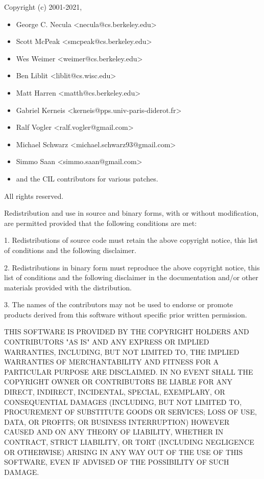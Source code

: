 \documentclass[letterpaper]{article}
\begin{document}
Copyright (c) 2001-2021,
\begin{itemize}
\item George C. Necula    <necula@cs.berkeley.edu>
\item Scott McPeak        <smcpeak@cs.berkeley.edu>
\item Wes Weimer          <weimer@cs.berkeley.edu>
\item Ben Liblit          <liblit@cs.wisc.edu>
\item Matt Harren         <matth@cs.berkeley.edu>
\item Gabriel Kerneis     <kerneis@pps.univ-paris-diderot.fr>
\item Ralf Vogler         <ralf.vogler@gmail.com>
\item Michael Schwarz     <michael.schwarz93@gmail.com>
\item Simmo Saan          <simmo.saan@gmail.com>
\item and the CIL contributors for various patches.
\end{itemize}
All rights reserved.

Redistribution and use in source and binary forms, with or without
modification, are permitted provided that the following conditions are met:

1. Redistributions of source code must retain the above copyright notice,
this list of conditions and the following disclaimer.

2. Redistributions in binary form must reproduce the above copyright notice,
this list of conditions and the following disclaimer in the documentation
and/or other materials provided with the distribution.

3. The names of the contributors may not be used to endorse or promote
products derived from this software without specific prior written
permission.

THIS SOFTWARE IS PROVIDED BY THE COPYRIGHT HOLDERS AND CONTRIBUTORS "AS IS"
AND ANY EXPRESS OR IMPLIED WARRANTIES, INCLUDING, BUT NOT LIMITED TO, THE
IMPLIED WARRANTIES OF MERCHANTABILITY AND FITNESS FOR A PARTICULAR PURPOSE
ARE DISCLAIMED. IN NO EVENT SHALL THE COPYRIGHT OWNER OR CONTRIBUTORS BE
LIABLE FOR ANY DIRECT, INDIRECT, INCIDENTAL, SPECIAL, EXEMPLARY, OR
CONSEQUENTIAL DAMAGES (INCLUDING, BUT NOT LIMITED TO, PROCUREMENT OF
SUBSTITUTE GOODS OR SERVICES; LOSS OF USE, DATA, OR PROFITS; OR BUSINESS
INTERRUPTION) HOWEVER CAUSED AND ON ANY THEORY OF LIABILITY, WHETHER IN
CONTRACT, STRICT LIABILITY, OR TORT (INCLUDING NEGLIGENCE OR OTHERWISE)
ARISING IN ANY WAY OUT OF THE USE OF THIS SOFTWARE, EVEN IF ADVISED OF THE
POSSIBILITY OF SUCH DAMAGE.
\end{document}
